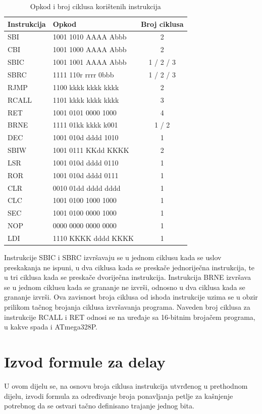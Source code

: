 \begin{table}[H]
\centering
\caption{Opkod i broj ciklusa korištenih instrukcija}
\label{tab:instructions}
\begin{tabular}{|l|l|c|}
\hline
\textbf{Instrukcija} & \textbf{Opkod} & \textbf{Broj ciklusa} \\
\hline
SBI   & 1001 1010 AAAA Abbb & 2 \\
CBI   & 1001 1000 AAAA Abbb & 2 \\
SBIC  & 1001 1001 AAAA Abbb & 1 / 2 / 3 \\
SBRC  & 1111 110r rrrr 0bbb & 1 / 2 / 3 \\
RJMP  & 1100 kkkk kkkk kkkk & 2 \\
RCALL & 1101 kkkk kkkk kkkk & 3 \\
RET   & 1001 0101 0000 1000 & 4 \\
BRNE  & 1111 01kk kkkk k001 & 1 / 2 \\
DEC   & 1001 010d dddd 1010 & 1 \\
SBIW  & 1001 0111 KKdd KKKK & 2 \\
LSR   & 1001 010d dddd 0110 & 1 \\
ROR   & 1001 010d dddd 0111 & 1 \\
CLR   & 0010 01dd dddd dddd & 1 \\
CLC   & 1001 0100 1000 1000 & 1 \\
SEC   & 1001 0100 0000 1000 & 1 \\
NOP   & 0000 0000 0000 0000 & 1 \\
LDI   & 1110 KKKK dddd KKKK & 1 \\
\hline
\end{tabular}
\end{table}

Instrukcije SBIC i SBRC izvršavaju se u jednom ciklusu kada se uslov
preskakanja ne ispuni, u dva ciklusa kada se preskače jednoriječna
instrukcija, te u tri ciklusa kada se preskače dvoriječna instrukcija.
Instrukcija BRNE izvršava se u jednom ciklusu kada se grananje ne izvrši,
odnosno u dva ciklusa kada se grananje izvrši. Ova zavisnost broja
ciklusa od ishoda instrukcije uzima se u obzir prilikom tačnog brojanja
ciklusa izvršavanja programa. Naveden broj ciklusa za instrukcije RCALL
i RET odnosi se na uređaje sa 16-bitnim brojačem programa, u kakve spada
i ATmega328P.
%
\section{Izvod formule za delay}
\label{sec:delay}
%
U ovom dijelu se, na osnovu broja ciklusa instrukcija utvrđenog u
prethodnom dijelu, izvodi formula za određivanje broja ponavljanja
petlje za kašnjenje potrebnog da se ostvari tačno definisano trajanje
jednog bita.

